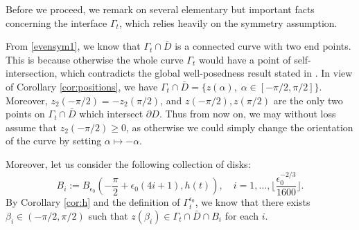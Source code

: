 \documentclass[11pt]{article}
\numberwithin{equation}{section}
\newcommand{\eps}{\epsilon}
\newcommand{\p}{\partial}
\begin{document}
Before we proceed, we remark on several elementary but important facts concerning the interface $\Gamma_t$, which relies heavily on the symmetry assumption. 

From \eqref{evensym1}, we know that $\Gamma_t \cap \bar D$ is a connected curve with two end points. This is because otherwise the whole curve $\Gamma_t$ would have a point of self-intersection, which contradicts the global well-posedness result stated in \cite{GGS25}. In view of Corollary \ref{cor:positions}, we have $\Gamma_t \cap \bar D = \{z(\alpha),\; \alpha \in [-\pi/2, \pi/2]\}.$ Moreover, $z_2(-\pi/2) = -z_2(\pi/2)$, and $z(-\pi/2), z(\pi/2)$ are the only two points on $\Gamma_t \cap \bar D$ which intersect $\p D$. Thus from now on, we may without loss assume that $z_2(-\pi/2) \ge 0$, as otherwise we could simply change the orientation of the curve by setting $\alpha \mapsto -\alpha$.

Moreover, let us consider the following collection of disks:
$$
B_i := B_{\eps_0}\left(-\frac{\pi}{2} + \eps_0(4i+1), h(t)\right),\quad i = 1,\hdots, \lfloor\frac{\eps_0^{-2/3}}{1600}\rfloor.
$$
By Corollary \ref{cor:h} and the definition of $\Gamma_t^{\eps_0}$, we know that there exists $\beta_i \in (-\pi/2,\pi/2)$ such that $z(\beta_i) \in \Gamma_t \cap \bar D \cap B_i$ for each $i$. 
\end{document}
